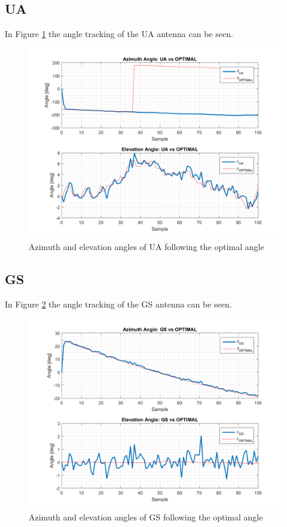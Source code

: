 \subsection{UA}
In Figure \ref{fig:s4_ua} the angle tracking of the UA antenna can be seen.

\begin{figure}[H]
\centering
\includegraphics[scale=0.75]{figures/scenario_4_ua.png}
\caption{Azimuth and elevation angles of UA following the optimal angle}
\label{fig:s4_ua}
\end{figure}

\subsection{GS}
In Figure \ref{fig:s4_gs} the angle tracking of the GS antenna can be seen.

\begin{figure}[H]
\centering
\includegraphics[scale=0.75]{figures/scenario_4_gs.png}
\caption{Azimuth and elevation angles of GS following the optimal angle}
\label{fig:s4_gs}
\end{figure}

